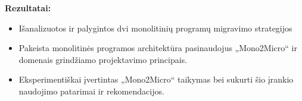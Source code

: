 \documentclass{VUMIFPSbakalaurinis}
\begin{document}
\textbf{Rezultatai:}
\begin{itemize}
    \item Išanalizuotos ir palygintos dvi monolitinių programų migravimo strategijos

    \item Pakeista monolitinės programos architektūra pasinaudojus „Mono2Micro“ ir domenais grindžiamo projektavimo principais.

    \item Eksperimentiškai įvertintas „Mono2Micro“ taikymas bei sukurti šio įrankio naudojimo patarimai ir rekomendacijos.





    
    
\end{itemize}
\end{document}
